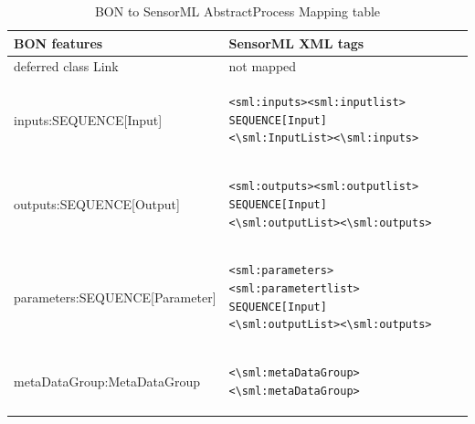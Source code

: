 \documentclass[]{final_report}
\begin{document}
\begin{table}[!th]
\centering
\begin{tabular}{|l|l|}
\hline
BON features & SensorML XML tags\\
\hline
   deferred class Link  & not mapped\\
\hline     
     inputs:SEQUENCE[Input] & \begin{lstlisting}
<sml:inputs><sml:inputlist>
SEQUENCE[Input]
<\sml:InputList><\sml:inputs>\end{lstlisting}\\

\hline 
     outputs:SEQUENCE[Output] & \begin{lstlisting}
<sml:outputs><sml:outputlist>
SEQUENCE[Input]
<\sml:outputList><\sml:outputs>\end{lstlisting}\\
\hline
     parameters:SEQUENCE[Parameter] & \begin{lstlisting}
<sml:parameters><sml:parametertlist>
SEQUENCE[Input]
<\sml:outputList><\sml:outputs>\end{lstlisting}\\

\hline                 
     metaDataGroup:MetaDataGroup &  \begin{lstlisting}
<\sml:metaDataGroup><\sml:metaDataGroup>\end{lstlisting}\\
 \hline    

\end{tabular}
\caption{BON to SensorML AbstractProcess Mapping table}\label{table:bon_sml_example}
\label{ex:table}
\end{table}
\end{document}
